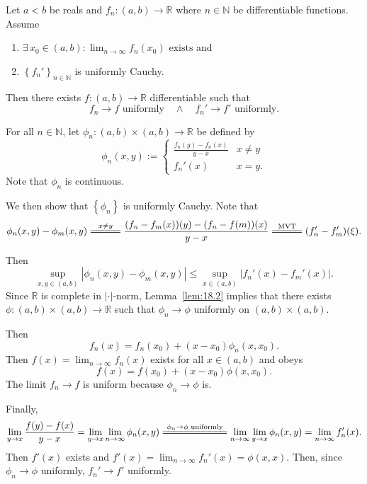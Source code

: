 \documentclass{notes}
\begin{document}
  \begin{thm}
    Let $a < b$ be reals and $f_n \colon (a, b) \to \mathbb R$ where $n \in \mathbb N$ be differentiable functions.
    Assume 
    \begin{enumerate}
      \item $\exists \, x_0 \in (a, b): \lim_{n \to \infty} f_n(x_0) \text{ exists}$ and 
        
      \item $\left \{ f_n' \right \}_{n \in \mathbb N}$ is uniformly Cauchy.
    \end{enumerate}
    Then there exists $f \colon (a, b) \to \mathbb R$ differentiable such that 
    \[
      f_n \to f \text{ uniformly} \quad \land \quad f_n' \to f' \text{ uniformly.}
    \]
  \end{thm}
  
  \begin{prf}
    For all $n \in \mathbb N$, let $\phi_n \colon (a, b) \times (a, b) \to \mathbb R$ be defined by 
    \[
      \phi_n(x, y) := \begin{cases}
        \frac{f_n(y) - f_n(x)}{y - x} & x \neq y \\ 
        f_n'(x) & x = y.
      \end{cases}
    \]
    Note that $\phi_n$ is continuous.
    
    We then show that $\left \{ \phi_n \right \}$ is uniformly Cauchy.
    Note that 
    \[
      \phi_n(x, y) - \phi_m(x, y) \overset{x \neq y}{=\joinrel=\joinrel=\joinrel=\joinrel=} \frac{(f_n - f_m(x))(y) - (f_n - f(m))(x)}{y - x} \overset{\text{MVT}}{=\joinrel=\joinrel=\joinrel=\joinrel=} (f_n' - f_m')(\xi).
    \]

    Then 
    \[
      \sup_{x, y \in (a, b)} \left | \phi_n(x, y) - \phi_m(x, y) \right | \leq \sup_{x \in (a, b)} \left | f_n'(x) - f_m'(x) \right |.
    \]
    Since $\mathbb R$ is complete in $\left | \cdot \right |$-norm, Lemma~\ref{lem:18.2} implies that there exists $\phi \colon (a, b) \times (a, b) \to \mathbb R$ such that $\phi_n \to \phi$ uniformly on $(a, b) \times (a, b)$.

    Then 
    \[
      f_n(x) = f_n(x_0) + (x - x_0) \phi_n(x, x_0).
    \]
    Then $f(x) = \lim_{n \to \infty} f_n(x)$ exists for all $x \in (a, b)$ and obeys 
    \[
      f(x) = f(x_0) + (x - x_0) \phi(x, x_0).
    \]
    The limit $f_n \to f$ is uniform because $\phi_n \to \phi$ is.

    Finally, 
    \[
      \lim_{y \to x} \frac{f(y) - f(x)}{y - x} = \lim_{y \to x} \lim_{n \to \infty} \phi_n(x, y) \overset{\phi_n \to \phi \text{ uniformly}}{=\joinrel=\joinrel=\joinrel=\joinrel=\joinrel=\joinrel=\joinrel=\joinrel=\joinrel=\joinrel=} \lim_{n \to \infty} \lim_{y \to x} \phi_n(x, y) = \lim_{n \to \infty} f_n'(x).
    \]
    Then $f'(x)$ exists and $f'(x) = \lim_{n \to \infty} f_n'(x) = \phi(x, x)$.
    Then, since $\phi_n \to \phi$ uniformly, $f_n' \to f'$ uniformly.
  \end{prf}
  
\end{document}
